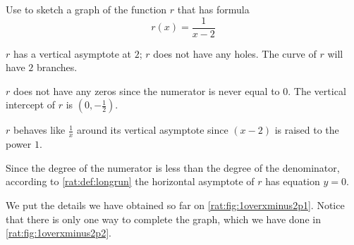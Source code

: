 \begin{pccexample}\label{rat:ex:1overxminus2p2}
Use  to sketch a graph of the function $r$ 
that has formula
\[
    r(x)=\frac{1}{x-2}
\]
\begin{pccsolution}
    \begin{steps}
        \item $r$ has a vertical asymptote at $2$; $r$ does not have any holes. The curve of 
         $r$ will have $2$ branches.
        \item $r$ does not have any zeros since the numerator is never equal to $0$. The
         vertical intercept of $r$ is $\left( 0,-\frac{1}{2} \right)$.
        \item $r$ behaves like $\frac{1}{x}$ around its vertical asymptote since $(x-2)$
         is raised to the power $1$.
        \item Since the degree of the numerator is less than the degree of the denominator, 
         according to \vref{rat:def:longrun} the horizontal asymptote of $r$ has equation $y=0$.
        \item We put the details we have obtained so far on \cref{rat:fig:1overxminus2p1}. Notice 
         that there is only one way to complete the graph, which we have done in \cref{rat:fig:1overxminus2p2}.
    \end{steps}
\end{pccsolution}
\end{pccexample}


